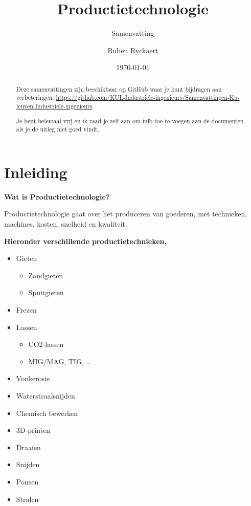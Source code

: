 \documentclass[a4paper,11pt,twoside]{report}
\title{Productietechnologie}
\subtitle{Samenvatting}
\author{Ruben Ryckaert}
\date{\today}
\begin{document}
\maketitle
\begin{abstract}
    Deze samenvattingen zijn beschikbaar op GitHub waar je kunt bijdragen aan verbeteringen: \url{https://github.com/KUL-Industriele-ingenieurs/Samenvattingen-Ku-leuven-Industriele-ingenieurs}

    Je bent helemaal vrij en ik raad je zelf aan om info toe te voegen aan de documenten als je de uitleg niet goed vindt.
\end{abstract}
\tableofcontents

\printformularium


\chapter{Inleiding}
\textbf{Wat is Productietechnologie?}

Productietechnologie gaat over het produceren van goederen, met technieken, machines, kosten, snelheid en kwaliteit.


\textbf{Hieronder verschillende productietechnieken,}

\begin{itemize}
    \item Gieten
          \begin{itemize}
              \item Zandgieten
              \item Spuitgieten
          \end{itemize}
    \item Frezen
    \item Lassen
          \begin{itemize}
              \item CO2-lassen
              \item MIG/MAG, TIG, \ldots
          \end{itemize}
    \item Vonkerosie
    \item Waterstraalsnijden
    \item Chemisch bewerken
    \item 3D-printen
    \item Draaien
    \item Snijden
    \item Ponsen
    \item Stralen
\end{itemize}
\end{document}
